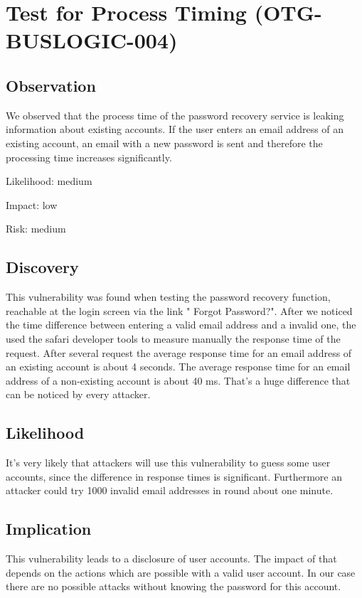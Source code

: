 \section{Test for Process Timing (OTG-BUSLOGIC-004)}
\subsection{Observation}
	We observed that the process time of the password recovery service is leaking information about existing accounts.
	If the user enters an email address of an existing account, an email with a new password is sent and therefore the processing time increases significantly.


Likelihood: medium \newline

Impact: low\newline

Risk: medium\newline

\subsection{Discovery}
This vulnerability was found when testing the password recovery function, reachable at the login screen via the link " Forgot Password?".
After we noticed the time difference between entering a valid email address and a invalid one, the used the safari developer tools to measure manually the response time of the request. After several request the average response time for an email address of an existing account is about 4 seconds. The  average response time for an email address of a non-existing account is about 40 ms. That's a huge difference that can be noticed by every attacker.



\subsection{Likelihood}
It's very likely that attackers will use this vulnerability to guess some user accounts, since the difference in response times is significant. Furthermore an attacker could try 1000 invalid email addresses in round about one minute. 

\subsection{Implication} 
This vulnerability leads to a disclosure of user accounts. The impact of that depends on the actions which are possible with a valid user account. In our case there are no possible attacks without knowing the password for this account.


